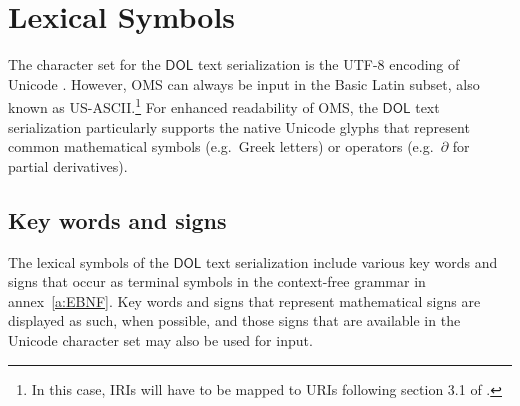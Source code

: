 \documentclass[10pt,fleqn,final]{scrreprt}
\makeatletter
\newcommand*\CommentAuthor{}
\renewcommand*\CommentAuthor{#1}}
\newcommand*\CommentDate{}
\renewcommand*\CommentDate{#1}}
\newcommand*\CommentId{}
\renewcommand*\CommentId{#1}}
\newcommand*\CommentType{}
\renewcommand*\CommentType{#1}}
\newcommand*{\SetCommentColorByType}[1]{%
\edef\localType{{#1}}%
\expandafter\ifstrequal\localType{q-aut}{\colorlet{CommentColor}{red}}{%
\expandafter\ifstrequal\localType{q-all}{\colorlet{CommentColor}{orange}}{%
\expandafter\ifstrequal\localType{todo}{\colorlet{CommentColor}{orange}}{%
\expandafter\ifstrequal\localType{fyi}{\colorlet{CommentColor}{lightgray}}{%
\colorlet{CommentColor}{yellow}}}}}}
\newcommand*{\SetCommentPrefixByType}[1]{%
\edef\localType{{#1}}%
\expandafter\@ifmtarg\localType{%
\edef\CommentPrefix{}%
}{%
\caseupper[q]{#1}%
\edef\CommentPrefix{\thestring: }%
}}
\newcommand*{\initComment}[1]{%
\setkeys{Comment}{#1}%
\SetCommentColorByType{\CommentType}%
\relax%
\SetCommentPrefixByType{\CommentType}%
\relax%
}
\newcommand*{\todonote}[2][]{%
\initComment{#1}%
\pdfcomment[author=\CommentAuthor,color=CommentColor,date=\CommentDate,id=\CommentId]{%
\CommentPrefix
#2}}
\renewcommand*{\todonote}[2][]{%
\initComment{#1}%
\ednote{\CommentPrefix #2}}
\newcommand*{\syntax}[1]{\texttt{#1}}
\newcommand*{\notallowed}{\textbf{not allowed}\xspace}
\newcommand*{\DOL}{\ensuremath{\mathsf{DOL}}\xspace}
\newcommand{\annexrefname}{annex}
\newcommand{\noterefname}{note}
\newcommand{\aref}[1]{\annexrefname~\ref{#1}}
\newcommand{\nref}[1]{\noterefname~\ref{#1}}
\newcommand{\sclause}[1]{\section{#1}}
\newcommand{\ssclause}[1]{\subsection{#1}}
\renewcommand{\nref}[1]{\ref{nref-#1}} %
\newenvironment{definitions}[0]{\medskip }{}
\providecommand{\DIFadd}[1]{{\protect\color{blue}\uwave{#1}}} %
\providecommand{\DIFaddbegin}{} %
\providecommand{\DIFaddend}{} %
\providecommand{\DIFdelbegin}{} %
\providecommand{\DIFdelend}{} %
\makeatother
\begin{document}
\begin{definitions}
%

\sclause{Lexical Symbols}

The character set for the \DOL text serialization is the UTF-8 encoding of Unicode \DIFdelbegin %
\DIFdelend \DIFaddbegin \DIFadd{\nref{UCS}}\DIFaddend .  However, OMS can always be input in the Basic Latin subset, also known as US-ASCII.\footnote{In this case, IRIs will have to be mapped to URIs following section 3.1 of \DIFdelbegin %
\DIFdelend \DIFaddbegin \DIFadd{\nref{IRI}}\DIFaddend .}  For enhanced readability of OMS, the \DOL text serialization particularly supports the native Unicode glyphs that represent common mathematical symbols (e.g.\ Greek letters)  or operators (e.g.\ $\partial$ for partial derivatives). %

\ssclause{Key words and signs}\label{c:keywords}

The lexical symbols of the \DOL text serialization include various key words and signs that occur as terminal symbols in the context-free grammar in \aref{a:EBNF}.   Key words and signs that represent mathematical signs are displayed as such, when possible, and those signs that are available in the Unicode character set may also be used for input.


\end{definitions}
\end{document}

